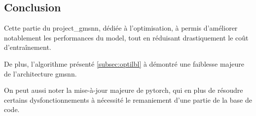 \subsection{Conclusion}
Cette partie du \gls{project_gmsnn}, dédiée à l'optimisation, à permis d'améliorer notablement les performances du \gls{model}, tout en réduisant drastiquement le coût d'entraînement.%

De plus, l'algorithme présenté \autoref{subsec:optilbl} à démontré une faiblesse majeure de l'architecture \gls{gmsnn}.

On peut aussi noter la mise-à-jour majeure de \gls{pytorch}, qui en plus de résoudre certains dysfonctionnements à nécessité le remaniement d'une partie de la base de code.
